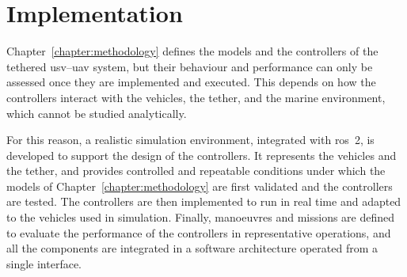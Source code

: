 
\chapter{Implementation}
\label{chapter:sys_implementation}

Chapter~\ref{chapter:methodology} defines the models and the controllers of the tethered \gls{usv}--\gls{uav} system, but their behaviour and performance can only be assessed once they are implemented and executed. This depends on how the controllers interact with the vehicles, the tether, and the marine environment, which cannot be studied analytically.

For this reason, a realistic simulation environment, integrated with \gls{ros}~2, is developed to support the design of the controllers. It represents the vehicles and the tether, and provides controlled and repeatable conditions under which the models of Chapter~\ref{chapter:methodology} are first validated and the controllers are tested. The controllers are then implemented to run in real time and adapted to the vehicles used in simulation. Finally, manoeuvres and missions are defined to evaluate the performance of the controllers in representative operations, and all the components are integrated in a software architecture operated from a single interface.








